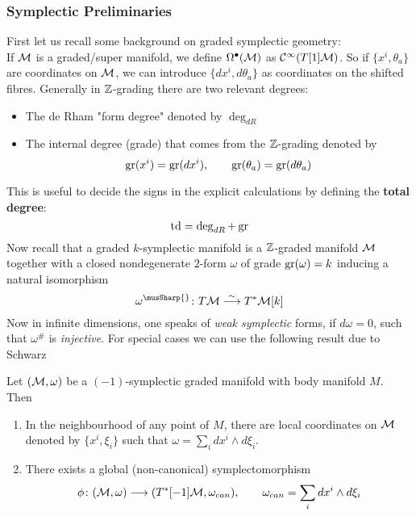 \subsubsection{Symplectic Preliminaries}
First let us recall some background on graded symplectic geometry:\\
If $\mathcal{M}$ is a graded/super manifold, we define $\Omega^\bullet(\mathcal{M})$ as $\mathcal{C}^{\infty}(T[1]\mathcal{M})$. So if $\{x^i, \theta_a\}$ are coordinates on $\mathcal{M}$, we can introduce $\{dx^i, d\theta_a\}$ as coordinates on the shifted fibres. Generally in $\mathbb{Z}$-grading there are two relevant degrees:
\begin{itemize}
  \item The de Rham "form degree" denoted by $\deg_{dR}$
  \item The internal degree (grade) that comes from the $\mathbb{Z}$-grading denoted by
  \begin{equation}\operatorname{gr}(x^i) = \operatorname{gr}(dx^i), \quad \quad \operatorname{gr}(\theta_a) = \operatorname{gr}(d\theta_a) \end{equation}
\end{itemize}
This is useful to decide the signs in the explicit calculations by defining the \textbf{total degree}:
\begin{equation}
  \operatorname{td} = \deg_{dR} + \operatorname{gr}
\end{equation}
Now recall that a graded $k$-symplectic manifold is a $\mathbb{Z}$-graded manifold $\mathcal{M}$ together with a closed nondegenerate $2$-form $\omega$ of grade $\operatorname{gr}(\omega) = k$ inducing a natural isomorphism
\begin{equation}
  \omega^{\musSharp{}} \colon T\MM \atob{\sim} T^* \MM[k]
\end{equation}
Now in infinite dimensions, one speaks of \emph{weak symplectic} forms, if $d \omega = 0$, such that $\omega^\#$ is \emph{injective}. For special cases we can use the following result due to Schwarz

\begin{theo}[Schwarz]
  Let $(\mathcal{M}, \omega)$ be a $(-1)$-symplectic graded manifold with body manifold $M$. Then
  \begin{enumerate}
    \item In the neighbourhood of any point of $M$, there are local coordinates on $\mathcal{M}$ denoted by $\{x^i, \xi_i\}$ such that $\omega = \sum_i dx^i \wedge d\xi_i$.

    \item There exists a global (non-canonical) symplectomorphism
    \begin{equation}
      \phi \colon (\MM, \omega) \lra (T^*[-1]\MM, \omega_{can}), \quad \quad \omega_{can} = \sum_i dx^i \wedge d\xi_i
    \end{equation}
  \end{enumerate}
\end{theo}

